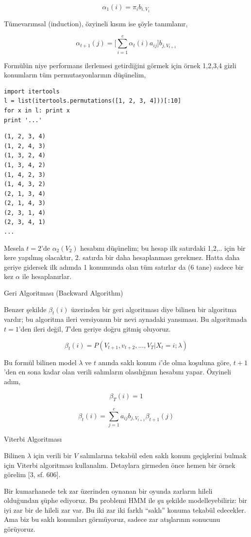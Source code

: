 \documentclass[12pt,fleqn]{article}\usepackage{../../common}
\begin{document}
$$ \alpha_1(i) = \pi_i b_{i,V_1} $$

Tümevarımsal (induction), özyineli kısım ise şöyle tanımlanır,

$$ \alpha_{t+1}(j) = \bigg[ \sum _{i=1}^{c} \alpha_t(i)a_{ij} \bigg] b_{j,V_{t+1}} $$

Formülün niye performans ilerlemesi getirdiğini görmek için örnek 1,2,3,4
gizli konumların tüm permutasyonlarının düşünelim,

\begin{verbatim}
import itertools
l = list(itertools.permutations([1, 2, 3, 4]))[:10]
for x in l: print x
print '...'
\end{verbatim}

\begin{verbatim}
(1, 2, 3, 4)
(1, 2, 4, 3)
(1, 3, 2, 4)
(1, 3, 4, 2)
(1, 4, 2, 3)
(1, 4, 3, 2)
(2, 1, 3, 4)
(2, 1, 4, 3)
(2, 3, 1, 4)
(2, 3, 4, 1)
...
\end{verbatim}

Mesela $t=2$'de $\alpha_2(V_2)$ hesabını düşünelim; bu hesap ilk satırdaki
1,2,.. için bir kere yapılmış olacaktır, 2. satırda bir daha hesaplanması
gerekmez. Hatta daha geriye gidersek ilk adımda 1 konumunda olan tüm
satırlar da (6 tane) sadece bir kez $\alpha$ ile hesaplanırlar.

Geri Algoritması (Backward Algorithm) 

Benzer şekilde $\beta_t(i)$ üzerinden bir geri algoritması diye bilinen bir
algoritma vardır; bu algoritma ileri versiyonun bir nevi aynadaki
yansıması. Bu algoritmada $t=1$'den ileri değil, $T$'den geriye doğru
gitmiş oluyoruz.

$$ \beta_t(i) = P(V_{t+1}, v_{t+2},...,V_{T} | X_t = i ; \lambda )  $$

Bu formül bilinen model $\lambda$ ve $t$ anında saklı konum $i$'de olma
koşuluna göre, $t+1$'den en sona kadar olan verili salımların olasılığının
hesabını yapar. Özyineli adım, 

$$ \beta_T(i) = 1 $$

$$ \beta_t(i) = \sum _{j=1}^{c} a_{ij}b_{j,V_{t+1}} \beta_{t+1}(j)  $$


Viterbi Algoritması

Bilinen $\lambda$ için verili bir $V$ salımlarına tekabül eden saklı konum
geçişlerini bulmak için Viterbi algoritması kullanalım. Detaylara girmeden
önce hemen bir örnek görelim [3, sf. 606].

Bir kumarhanede tek zar üzerinden oynanan bir oyunda zarların hileli
olduğundan şüphe ediyoruz. Bu problemi HMM ile şu şekilde modelleyebiliriz:
bir iyi zar bir de hileli zar var. Bu iki zar iki farklı ``saklı'' konuma
tekabül edecekler. Ama biz bu saklı konumları görmüyoruz, sadece zar
atışlarının sonucunu görüyoruz. 
\end{document}
